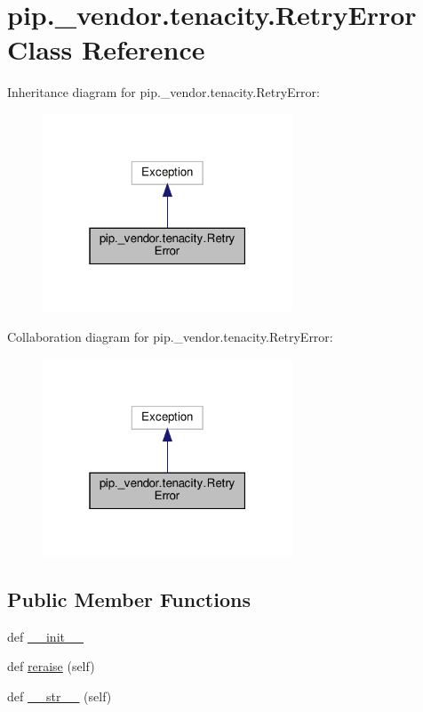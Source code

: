 \hypertarget{classpip_1_1__vendor_1_1tenacity_1_1RetryError}{}\section{pip.\+\_\+vendor.\+tenacity.\+Retry\+Error Class Reference}
\label{classpip_1_1__vendor_1_1tenacity_1_1RetryError}


Inheritance diagram for pip.\+\_\+vendor.\+tenacity.\+Retry\+Error\+:
\nopagebreak
\begin{figure}[H]
\begin{center}
\leavevmode
\includegraphics[width=211pt]{classpip_1_1__vendor_1_1tenacity_1_1RetryError__inherit__graph}
\end{center}
\end{figure}


Collaboration diagram for pip.\+\_\+vendor.\+tenacity.\+Retry\+Error\+:
\nopagebreak
\begin{figure}[H]
\begin{center}
\leavevmode
\includegraphics[width=211pt]{classpip_1_1__vendor_1_1tenacity_1_1RetryError__coll__graph}
\end{center}
\end{figure}
\subsection*{Public Member Functions}
\begin{DoxyCompactItemize}
\item 
def \hyperlink{classpip_1_1__vendor_1_1tenacity_1_1RetryError_a090796cca2b1c3baf427c515ab445ff7}{\+\_\+\+\_\+init\+\_\+\+\_\+}
\item 
def \hyperlink{classpip_1_1__vendor_1_1tenacity_1_1RetryError_ac9013494b28491215483f8387b661922}{reraise} (self)
\item 
def \hyperlink{classpip_1_1__vendor_1_1tenacity_1_1RetryError_a537e84f3a7b8e71ef22f9fca32496b3e}{\+\_\+\+\_\+str\+\_\+\+\_\+} (self)
\end{DoxyCompactItemize}
